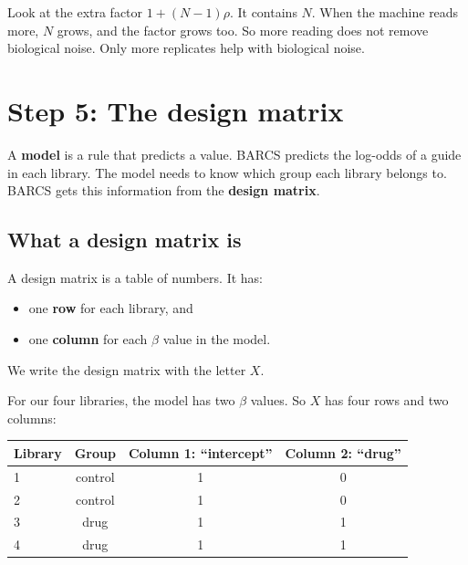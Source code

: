 \documentclass[12pt]{article}
\begin{document}
\begin{remember}
Look at the extra factor $1 + (N-1)\rho$. It contains $N$. When the machine
reads more, $N$ grows, and the factor grows too. So more reading does not
remove biological noise. Only more replicates help with biological noise.
\end{remember}

\section{Step 5: The design matrix}

A \textbf{model} is a rule that predicts a value. BARCS predicts the
log-odds of a guide in each library. The model needs to know which group
each library belongs to. BARCS gets this information from the
\textbf{design matrix}.

\subsection{What a design matrix is}

A design matrix is a table of numbers. It has:
\begin{itemize}
\item one \textbf{row} for each library, and
\item one \textbf{column} for each $\beta$ value in the model.
\end{itemize}
We write the design matrix with the letter $X$.

For our four libraries, the model has two $\beta$ values. So $X$ has four
rows and two columns:

\begin{center}
\begin{tabular}{lc|cc}
\toprule
Library & Group & Column 1: ``intercept'' & Column 2: ``drug''\\
\midrule
1 & control & 1 & 0\\
2 & control & 1 & 0\\
3 & drug    & 1 & 1\\
4 & drug    & 1 & 1\\
\bottomrule
\end{tabular}
\end{center}
\end{document}
